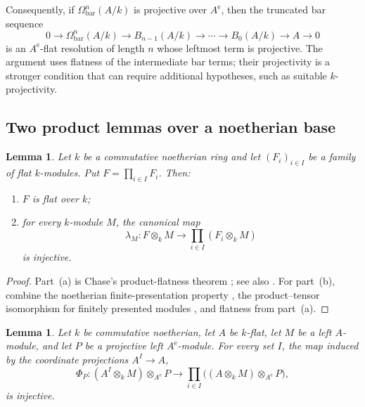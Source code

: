 \documentclass[11pt]{article}
\numberwithin{equation}{section}
\newtheorem{lemma}[theorem]{Lemma}
\theoremstyle{definition}
\theoremstyle{remark}
\begin{document}
Consequently, if $\Omega^n_{\mathrm{bar}}(A/k)$ is projective over
$A^{\mathrm e}$, then the truncated bar sequence
\begin{equation}
0\longrightarrow\Omega^n_{\mathrm{bar}}(A/k)
\longrightarrow B_{n-1}(A/k)\longrightarrow\cdots
\longrightarrow B_0(A/k)\longrightarrow A\longrightarrow0
\label{sy:eq:truncated-bar}
\end{equation}
is an $A^{\mathrm e}$-flat resolution of length $n$ whose leftmost term is
projective.  The argument uses flatness of the intermediate bar terms; their
projectivity is a stronger condition that can require additional
hypotheses, such as suitable $k$-projectivity.

\subsection{Two product lemmas over a noetherian base}

\begin{lemma}
\label{sy:lem:noeth-product}
Let $k$ be a commutative noetherian ring and let $(F_i)_{i\in I}$ be a
family of flat $k$-modules.  Put $F=\prod_{i\in I}F_i$.  Then:
\begin{enumerate}[label=\textup{(\alph*)}]
\item $F$ is flat over $k$;
\item for every $k$-module $M$, the canonical map
\begin{equation}
\lambda_M:F\otimes_k M\longrightarrow
\prod_{i\in I}(F_i\otimes_k M)
\label{sy:eq:lambda-base}
\end{equation}
is injective.
\end{enumerate}
\end{lemma}

\begin{proof}
Part~\textup{(a)} is Chase's product-flatness theorem
\cite[Theorem~2.1]{Chase}; see also
\cite[Algebra, Proposition~10.90.6, Tag~05CZ]{StacksProject}.
For part~\textup{(b)}, combine the noetherian finite-presentation
property \cite[Algebra, Lemma~10.31.4, Tag~00FP]{StacksProject},
the product--tensor isomorphism for finitely presented modules
\cite[Algebra, Proposition~10.89.3, Tag~059K]{StacksProject},
and flatness from part~\textup{(a)}.
\end{proof}

\begin{lemma}
\label{sy:lem:projective-comparison}
Let $k$ be commutative noetherian, let $A$ be $k$-flat, let $M$ be a left
$A$-module, and let $P$ be a projective left $A^{\mathrm e}$-module.  For
every set $I$, the map induced by the coordinate projections $A^I\to A$,
\begin{equation}
\Phi_P:
(A^I\otimes_k M)\otimes_{A^{\mathrm e}}P
\longrightarrow
\prod_{i\in I}
\bigl((A\otimes_kM)\otimes_{A^{\mathrm e}}P\bigr),
\label{sy:eq:PhiP}
\end{equation}
is injective.
\end{lemma}
\end{document}
